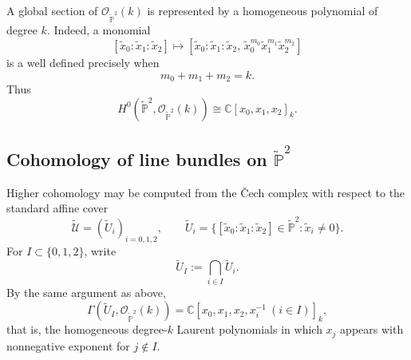 \documentclass[dvipsnames,11pt]{article}
\theoremstyle{definition}
\newcommand{\cO}{\mathcal{O}}
\newcommand{\C}{{\mathbb C}}
\renewcommand{\P}{{\mathbb P}}
\begin{document}
\begin{appendices}
A global section of \(\cO_{\widetilde{\P}^2}(k)\) is represented by a homogeneous polynomial of degree \(k\). Indeed, a monomial
\[
[\widetilde x_0:\widetilde x_1:\widetilde x_2]
\mapsto
[\widetilde x_0:\widetilde x_1:\widetilde x_2,\,
\widetilde x_0^{m_0}\widetilde x_1^{m_1}\widetilde x_2^{m_2}]
\]
is a well defined precisely when
\[
m_0+m_1+m_2=k.
\]
Thus
\begin{equation}\label{eq:h0}
H^0(\widetilde{\P}^2,\cO_{\widetilde{\P}^2}(k))
\cong
\C[x_0,x_1,x_2]_k.
\end{equation}

\subsection{Cohomology of line bundles on \texorpdfstring{$\widetilde{\P}^2$}{P2-tilde}}

Higher cohomology may be computed from the \v Cech complex with respect to the standard affine cover
\[
\widetilde{\mathcal U}=(\widetilde U_i)_{i=0,1,2},
\qquad
\widetilde U_i
=
\bigl\{
[\widetilde x_0:\widetilde x_1:\widetilde x_2]\in\widetilde{\P}^2 : \widetilde x_i\neq 0
\bigr\}.
\]
For \(I\subset \{0,1,2\}\), write
\[
\widetilde U_I:=\bigcap_{i\in I}\widetilde U_i.
\]
By the same argument as above,
\[
\Gamma(\widetilde U_I,\cO_{\widetilde{\P}^2}(k))
=
\C[x_0,x_1,x_2,x_i^{-1}\ (i\in I)]_k,
\]
that is, the homogeneous degree-\(k\) Laurent polynomials in which \(x_j\) appears with nonnegative exponent for \(j\notin I\).


\end{appendices}
\end{document}
